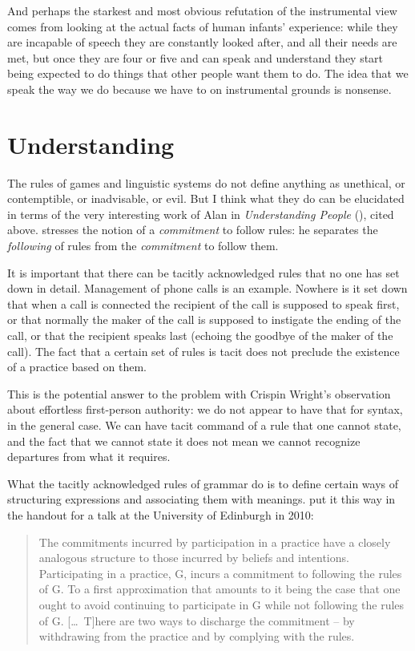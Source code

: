 \documentclass[output=paper]{langscibook}
\begin{document}
And perhaps the starkest and most obvious refutation of the instrumental view comes from looking at the actual facts of human infants' experience: while they are incapable of speech they are constantly looked after, and all their needs are met, but once they are four or five and can speak and understand they start being expected to do things that other people want them to do. The idea that we speak the way we do because we have to on instrumental grounds is nonsense.

\section{Understanding}
\label{sec:pullum:understanding}

The  rules of games and linguistic systems do not define anything as unethical, or contemptible, or inadvisable, or evil.  But I think what they do can be elucidated in terms of the very interesting work of Alan {\Millar} in \textit{Understanding People} (\citeyear{Millar04}), cited above. {\Millar} stresses the notion of a \emph{commitment} to follow rules: he separates the \emph{following} of rules from the \emph{commitment} to follow them.

It is important that there can be tacitly acknowledged rules that no one has set down in detail. Management of phone calls is an example. Nowhere is it set down that when a call is connected the recipient of the call is supposed to speak first, or that normally the maker of the call is supposed to instigate the ending of the call, or that the recipient speaks last (echoing the goodbye of the maker of the call). The fact that a certain set of rules is tacit does not preclude the existence of a practice based on them.

This is the potential answer to the problem with Crispin Wright's observation about effortless first-person authority: we do not appear to have that for syntax, in the general case.  We can have tacit command of a rule that one cannot state, and the fact that we cannot state it does not mean we cannot recognize departures from what it requires.

What the tacitly acknowledged rules of grammar do is to define certain ways of structuring expressions and associating them with meanings. {\Millar} put it this way in the handout for a talk at the University of Edinburgh in 2010:

\begin{quote}
The commitments incurred by participation in a practice have a closely analogous structure to those incurred by beliefs and intentions. Participating in a practice, G, incurs a commitment to following the rules of G.  To a first approximation that amounts to it being the case that one ought to avoid continuing to participate in G while not following the rules of G.  [\ldots\ T]here are two ways to discharge the commitment -- by withdrawing from the practice and by complying with the rules. \end{quote} 
\end{document}
